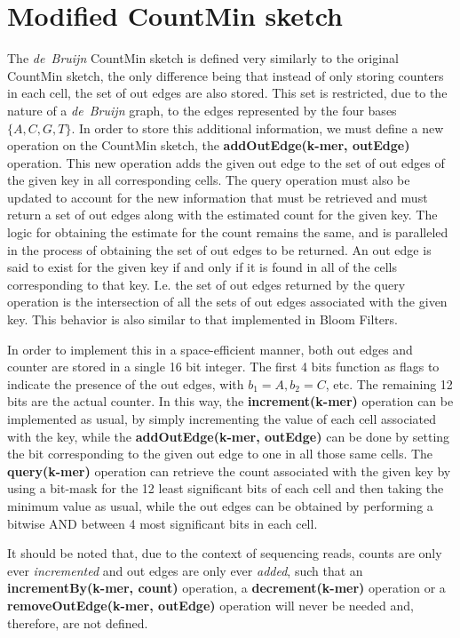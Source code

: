 \section{Modified CountMin sketch}

The \emph{de~Bruijn} CountMin sketch is defined very similarly to the original CountMin sketch, the only difference being that instead of only storing counters in each cell, the set of out edges are also stored.
This set is restricted, due to the nature of a \emph{de~Bruijn} graph, to the edges represented by the four bases $\{A, C, G, T\}$.
In order to store this additional information, we must define a new operation on the CountMin sketch, the \textbf{addOutEdge(k-mer, outEdge)} operation.
This new operation adds the given out edge to the set of out edges of the given key in all corresponding cells. The query operation must also be updated
to account for the new information that must be retrieved and must return a set of out edges along with the estimated count for the given key.
The logic for obtaining the estimate for the count remains the same, and is paralleled in the process of obtaining the set of out edges to be returned.
An out edge is said to exist for the given key if and only if it is found in all of the cells corresponding to that key. I.e. the set of out edges
returned by the query operation is the intersection of all the sets of out edges associated with the given key. This behavior is also similar to that
implemented in Bloom Filters.

In order to implement this in a space-efficient manner, both out edges and counter are stored in a single 16 bit integer. The first 4 bits
function as flags to indicate the presence of the out edges, with $b_1 = A, b_2 = C$, etc. The remaining 12 bits are the actual counter.
In this way, the \textbf{increment(k-mer)} operation can be implemented as usual, by simply incrementing the value of each cell associated with the key,
while the \textbf{addOutEdge(k-mer, outEdge)} can be done by setting the bit corresponding to the given out edge to one in all those same cells.
The \textbf{query(k-mer)} operation can retrieve the count associated with the given key by using a bit-mask for the 12 least significant bits of each
cell and then taking the minimum value as usual, while the out edges can be obtained by performing a bitwise AND between 4 most significant bits
in each cell.

It should be noted that, due to the context of sequencing reads, counts are only ever \emph{incremented} and out edges are only ever \emph{added},
such that an \textbf{incrementBy(k-mer, count)} operation, a \textbf{decrement(k-mer)} operation or a \textbf{removeOutEdge(k-mer, outEdge)} operation will never be needed and,
therefore, are not defined.

